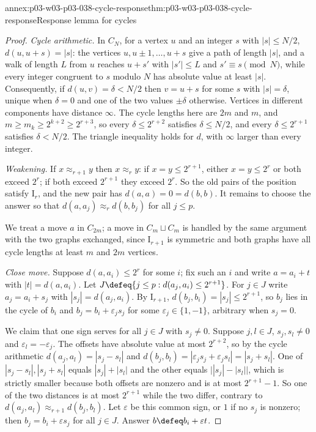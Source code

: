 \begin{annexitem}{annex:p03-w03-p03-038-cycle-response}{thm:p03-w03-p03-038-cycle-response}{Response lemma for cycles}
\begin{proof}
\emph{Cycle arithmetic.} In \(C_N\), for a vertex \(u\) and an integer \(s\)
with \(|s|\le N/2\), \(d(u,u+s)=|s|\): the vertices
\(u,u\pm1,\ldots,u+s\) give a path of length \(|s|\), and a walk of length
\(L\) from \(u\) reaches \(u+s'\) with \(|s'|\le L\) and \(s'\equiv s\pmod N\),
while every integer congruent to \(s\) modulo \(N\) has absolute value at least
\(|s|\). Consequently, if \(d(u,v)=\delta<N/2\) then \(v=u+s\) for some
\(s\) with \(|s|=\delta\), unique when \(\delta=0\) and one of the two values
\(\pm\delta\) otherwise. Vertices in different components have distance
\(\infty\). The cycle lengths here are \(2m\) and \(m\), and
\(m\ge m_k\ge2^{k+2}\ge2^{r+3}\), so every \(\delta\le2^{r+2}\) satisfies
\(\delta\le N/2\), and every \(\delta\le2^{r+1}\) satisfies \(\delta<N/2\).
The triangle inequality holds for \(d\), with \(\infty\) larger than every
integer.

\emph{Weakening.} If \(x\approx_{r+1}y\) then \(x\approx_ry\): if
\(x=y\le2^{r+1}\), either \(x=y\le2^r\) or both exceed \(2^r\); if both exceed
\(2^{r+1}\) they exceed \(2^r\). So the old pairs of the position satisfy
\(\mathrm I_r\), and the new pair has \(d(a,a)=0=d(b,b)\). It remains to choose
the answer so that \(d(a,a_j)\approx_rd(b,b_j)\) for all \(j\le p\).

We treat a move \(a\) in \(C_{2m}\); a move in \(C_m\sqcup C_m\) is handled by
the same argument with the two graphs exchanged, since \(\mathrm I_{r+1}\) is
symmetric and both graphs have all cycle lengths at least \(m\) and \(2m\)
vertices.

\emph{Close move.} Suppose \(d(a,a_i)\le2^r\) for some \(i\); fix such an
\(i\) and write \(a=a_i+t\) with \(|t|=d(a,a_i)\). Let
\(J\defeq\{j\le p:d(a_j,a_i)\le2^{r+1}\}\). For \(j\in J\) write
\(a_j=a_i+s_j\) with \(|s_j|=d(a_j,a_i)\). By \(\mathrm I_{r+1}\),
\(d(b_j,b_i)=|s_j|\le2^{r+1}\), so \(b_j\) lies in the cycle of \(b_i\) and
\(b_j=b_i+\varepsilon_js_j\) for some \(\varepsilon_j\in\{1,-1\}\), arbitrary
when \(s_j=0\).

We claim that one sign serves for all \(j\in J\) with \(s_j\ne0\). Suppose
\(j,l\in J\), \(s_j,s_l\ne0\) and \(\varepsilon_l=-\varepsilon_j\). The offsets
have absolute value at most \(2^{r+2}\), so by the cycle arithmetic
\(d(a_j,a_l)=|s_j-s_l|\) and \(d(b_j,b_l)=|\varepsilon_js_j+\varepsilon_js_l|
=|s_j+s_l|\). One of \(|s_j-s_l|,|s_j+s_l|\) equals \(|s_j|+|s_l|\) and the
other equals \(\bigl||s_j|-|s_l|\bigr|\), which is strictly smaller because
both offsets are nonzero and is at most \(2^{r+1}-1\). So one of the two
distances is at most \(2^{r+1}\) while the two differ, contrary to
\(d(a_j,a_l)\approx_{r+1}d(b_j,b_l)\). Let \(\varepsilon\) be this common sign,
or \(1\) if no \(s_j\) is nonzero; then \(b_j=b_i+\varepsilon s_j\) for all
\(j\in J\). Answer \(b\defeq b_i+\varepsilon t\).


\end{proof}
\end{annexitem}
